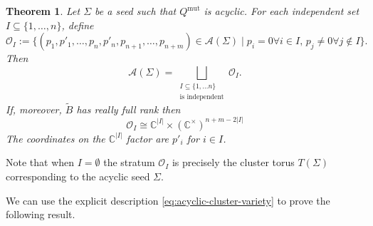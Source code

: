 \documentclass{amsart}
\newcommand{\seed}{\Sigma}
\newcommand{\mut}{\mathrm{mut}}
\newcommand{\exmatrix}[1]{\widetilde{#1}}
\newcommand{\var}{\mathcal{A}}
\newcommand{\C}{\mathbb{C}}
\numberwithin{equation}{section}
\newtheorem{theorem}{Theorem}[section]
\theoremstyle{definition}
\begin{document}
    \begin{theorem}\label{thm:def-mathcalO}
Let $\seed$ be a seed such that $Q^{\mut}$ is acyclic. For each independent set $I \subseteq \{1,\dots,n\}$, define
\[
\mathcal{O}_I := \{(p_1, p'_1, \dots, p_n, p'_n, p_{n+1}, \dots, p_{n+m}) \in \var(\seed) \mid p_i = 0 \forall i \in I, \, p_j \neq 0 \forall j \notin I\}. 
\]
Then
\[
\var(\seed) = \bigsqcup_{\substack{I \subseteq \{1,\ldots n\} \\ \text{is independent}}} \mathcal{O}_I. 
\]
If, moreover, $\exmatrix{B}$ has really full rank then
\[
\mathcal{O}_I \cong \C^{|I|} \times (\C^{\times})^{n+m-2|I|}
\]
The coordinates on the $\C^{|I|}$ factor are $p'_i$ for $i \in I$. 
    \end{theorem}

    Note that when $I = \emptyset$ the stratum $\mathcal{O}_I$ is precisely the cluster torus $T(\seed)$ corresponding to the acyclic seed $\seed$. 

We can use the explicit description \eqref{eq:acyclic-cluster-variety} to prove the following result.
\end{document}
